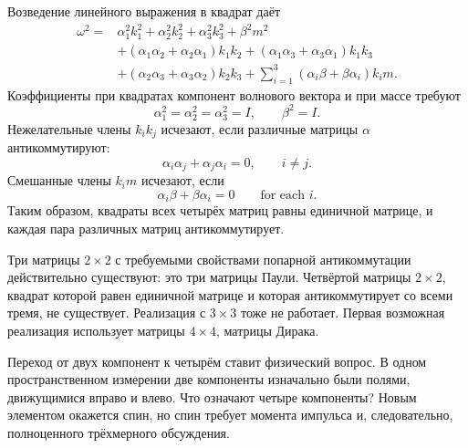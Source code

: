 Возведение линейного выражения в квадрат даёт
\begin{align}
\omega^2
={}&
\alpha_1^2k_1^2+\alpha_2^2k_2^2+\alpha_3^2k_3^2+\beta^2m^2
\nonumber\\
&+(\alpha_1\alpha_2+\alpha_2\alpha_1)k_1k_2
+(\alpha_1\alpha_3+\alpha_3\alpha_1)k_1k_3
\nonumber\\
&+(\alpha_2\alpha_3+\alpha_3\alpha_2)k_2k_3
+\sum_{i=1}^{3}(\alpha_i\beta+\beta\alpha_i)k_i m.
\end{align}
Коэффициенты при квадратах компонент волнового вектора и при массе требуют
\begin{equation}
\alpha_1^2=\alpha_2^2=\alpha_3^2=I,
\qquad
\beta^2=I.
\end{equation}
Нежелательные члены \(k_i k_j\) исчезают, если различные матрицы \(\alpha\) антикоммутируют:
\begin{equation}
\alpha_i\alpha_j+\alpha_j\alpha_i=0,
\qquad i\neq j.
\end{equation}
Смешанные члены \(k_i m\) исчезают, если
\begin{equation}
\alpha_i\beta+\beta\alpha_i=0
\qquad
\text{for each }i.
\end{equation}
Таким образом, квадраты всех четырёх матриц равны единичной матрице, и каждая пара различных матриц антикоммутирует.

Три матрицы \(2\times2\) с требуемыми свойствами попарной антикоммутации действительно существуют: это три матрицы Паули. Четвёртой матрицы \(2\times2\), квадрат которой равен единичной матрице и которая антикоммутирует со всеми тремя, не существует. Реализация с \(3\times3\) тоже не работает. Первая возможная реализация использует матрицы \(4\times4\), матрицы Дирака.

Переход от двух компонент к четырём ставит физический вопрос. В одном пространственном измерении две компоненты изначально были полями, движущимися вправо и влево. Что означают четыре компоненты? Новым элементом окажется спин, но спин требует момента импульса и, следовательно, полноценного трёхмерного обсуждения.

